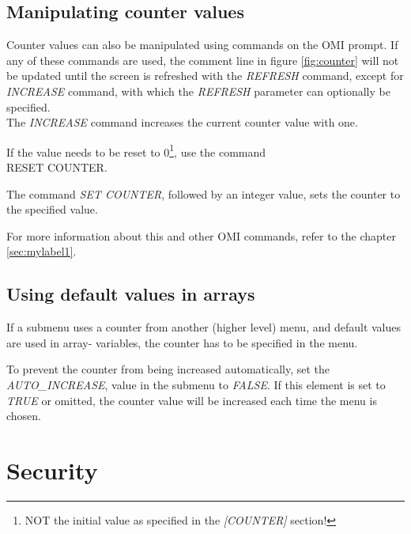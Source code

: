 \documentclass[a4paper]{book}
\newcommand{\vs}{\vspace{3mm}}
\renewcommand{\indent}{\hspace*{5mm}}
\begin{document}
\subsection{Manipulating counter values}
\label{subsubsec:manipulating}

Counter values can also be manipulated using commands on the OMI prompt. If 
any of these commands are used, the comment line in figure \ref{fig:counter} will not be 
updated until the screen is refreshed with the \textsl{REFRESH} command, except for \textsl{INCREASE} 
command, with which the \textsl{REFRESH} parameter can optionally be specified. \\
The \textsl{INCREASE} command increases the current 
counter value with one.

\vs

If the value needs to be reset to 0\footnote{ NOT the initial value as 
specified in the \textsl{[COUNTER]} section!}\label{fnote:resetcounter},
\setcounter{resetfnote}{\value{footnote}}
use the command \\
\indent\textsf{RESET COUNTER}.

The command \textsl{SET COUNTER}, 
followed by an integer value, sets the counter to the specified value.

\vs

For more information about this and other OMI commands, refer to the chapter 
\ref{sec:mylabel1}.

\subsection{Using default values in arrays}
\label{subsubsec:using}

If a submenu uses a counter from another (higher level) menu, and default 
values are used in array- variables, the counter has to be specified in the 
menu.

To prevent the counter from being increased automatically, set the 
\linebreak\textsl{AUTO{\_}INCREASE}, value in 
the submenu to \textsl{FALSE}. If this element is set to \textsl{TRUE} or omitted, the counter 
value will be increased each time the menu is chosen.

\section{Security}
\label{subsec:security}
\end{document}
